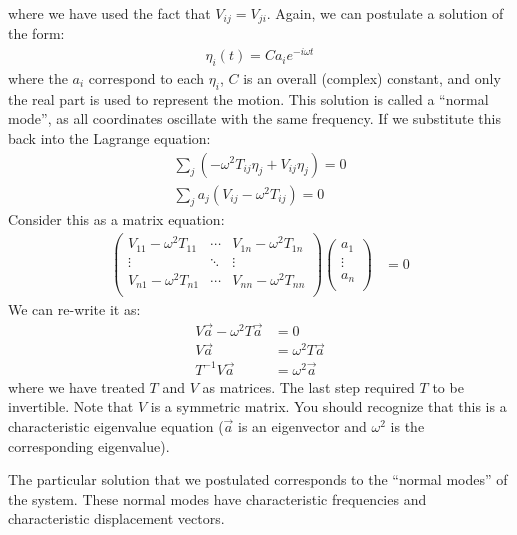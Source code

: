 where we have used the fact that $V_{ij}=V_{ji}$. Again, we can postulate a solution of the form:
\begin{align}
\eta_i(t)=Ca_ie^{-i\omega t}
\end{align}
where the $a_i$ correspond to each $\eta_i$, $C$ is an overall (complex) constant, and only the real part is used to represent the motion. This solution is called a ``normal mode'', as all coordinates oscillate with the same frequency. If we substitute this back into the Lagrange equation:
\begin{align}
\sum_{j}\left(-\omega^2 T_{ij}\eta_j+V_{ij}\eta_j\right)=0\nonumber\\
\sum_{j}a_j(V_{ij}-\omega^2T_{ij})=0
\end{align}
Consider this as a matrix equation:
\begin{align}
\left(\begin{array}{ccc}
V_{11}-\omega^2T_{11}&\cdots &V_{1n}-\omega^2T_{1n} \\
\vdots &\ddots &\vdots \\
V_{n1}-\omega^2T_{n1}&\cdots &V_{nn}-\omega^2T_{nn} \\
\end{array}\right) \left( \begin{array}{c} a_1\\ \vdots \\ a_n\\ \end{array}  \right)& =0
\end{align}
We can re-write it as:
\begin{align}
V\vec{a}-\omega^2T\vec{a}&=0\nonumber\\
V\vec{a}&=\omega^2T\vec{a}\nonumber\\
T^{-1}V\vec{a}&=\omega^2\vec{a}
\end{align}
where we have treated $T$ and $V$ as matrices. The last step required $T$ to be invertible. Note that $V$ is a symmetric matrix. You should recognize that this is a characteristic eigenvalue equation ($\vec{a}$ is an eigenvector and $\omega^2$ is the corresponding eigenvalue).

The particular solution that we postulated corresponds to the ``normal modes'' of the system. These normal modes have characteristic frequencies and characteristic displacement vectors.

